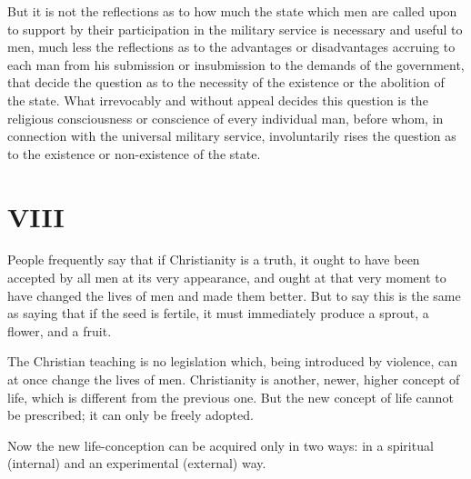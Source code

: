 \documentclass{book}
\begin{document}
But it is not the reflections as to how much the state which men are called upon to support by their participation in the military service is necessary and useful to men, much less the reflections as to the advantages or disadvantages accruing to each man from his submission or insubmission to the demands of the government, that decide the question as to the necessity of the existence or the abolition of the state. What irrevocably and without appeal decides this question is the religious consciousness or conscience of every individual man, before whom, in connection with the universal military service, involuntarily rises the question as to the existence or non-existence of the state.

\chapter*{VIII}
\label{chapter-8}
People frequently say that if Christianity is a truth, it ought to have been accepted by all men at its very appearance, and ought at that very moment to have changed the lives of men and made them better. But to say this is the same as saying that if the seed is fertile, it must immediately produce a sprout, a flower, and a fruit.

The Christian teaching is no legislation which, being introduced by violence, can at once change the lives of men. Christianity is another, newer, higher concept of life, which is different from the previous one. But the new concept of life cannot be prescribed; it can only be freely adopted.

Now the new life-conception can be acquired only in two ways: in a spiritual (internal) and an experimental (external) way.
\end{document}
